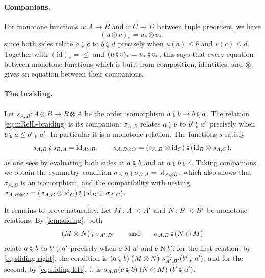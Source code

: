 \documentclass[11pt,a4paper]{article}
\theoremstyle{plain}
\theoremstyle{definition}
\theoremstyle{remark}
\newcommand{\then}{\mathbin{\fatsemi}}
\newcommand{\tc}{\mathbin{\fatsemi_{\!\scriptscriptstyle\langle}}}
\newcommand{\profto}{\mathrel{\ooalign{\hfil$\mapstochar\mkern 5mu$\hfil\cr$\to$\cr}}}
\newcommand{\rel}[3]{#1 \mathrel{#2} #3}
\newcommand{\id}{\mathrm{id}}
\newcommand{\comp}[1]{#1_{*}}
\begin{document}
\paragraph{Companions.}
For monotone functions $u \colon A \to B$ and $v \colon C \to D$ between tuple preorders, we have
\begin{equation}
    \label{eq:companion-strict-product}
    \comp{(u \otimes v)} = \comp{u} \otimes \comp{v},
\end{equation}
since both sides relate $a \tc c$ to $b \tc d$ precisely when $u(a) \leq b$ and $v(c) \leq d$.
Together with $\comp{(\id)} = {\leq}$ and $\comp{(u \then v)} = \comp{u} \then \comp{v}$, this says that every equation between monotone functions which is built from composition, identities, and $\otimes$ gives an equation between their companions.

\paragraph{The braiding.}
Let $s_{A,B} \colon A \otimes B \to B \otimes A$ be the order isomorphism $a \tc b \mapsto b \tc a$.
The relation \cref{eq:mRelL-braiding} is its companion: $\sigma_{A,B}$ relates $a \tc b$ to $b' \tc a'$ precisely when $b \tc a \leq b' \tc a'$.
In particular it is a monotone relation.
The functions $s$ satisfy
\begin{equation*}
    s_{A,B} \then s_{B,A} = \id_{A \otimes B},
    \qquad
    s_{A, B \otimes C} = (s_{A,B} \otimes \id_C) \then (\id_B \otimes s_{A,C}),
\end{equation*}
as one sees by evaluating both sides at $a \tc b$ and at $a \tc b \tc c$.
Taking companions, we obtain the symmetry condition $\sigma_{A,B} \then \sigma_{B,A} = \id_{A \otimes B}$, which also shows that $\sigma_{A,B}$ is an isomorphism, and the compatibility with nesting $\sigma_{A, B \otimes C} = (\sigma_{A,B} \otimes \id_C) \then (\id_B \otimes \sigma_{A,C})$.

It remains to prove naturality.
Let $M \colon A \profto A'$ and $N \colon B \profto B'$ be monotone relations.
By \cref{lem:sliding}, both
\begin{equation*}
    (M \otimes N) \then \sigma_{A',B'}
    \qquad \text{and} \qquad
    \sigma_{A,B} \then (N \otimes M)
\end{equation*}
relate $a \tc b$ to $b' \tc a'$ precisely when $\rel{a}{M}{a'}$ and $\rel{b}{N}{b'}$: for the first relation, by \cref{eq:sliding-right}, the condition is $\rel{(a \tc b)}{(M \otimes N)}{s_{A',B'}^{-1}(b' \tc a')}$, and for the second, by \cref{eq:sliding-left}, it is $\rel{s_{A,B}(a \tc b)}{(N \otimes M)}{(b' \tc a')}$.
\end{document}
